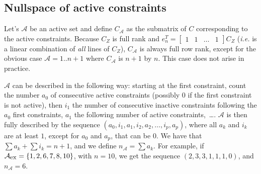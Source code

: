 \documentclass[]{article}
\newcommand{\BIN}{\begin{bmatrix}}
\newcommand{\BOUT}{\end{bmatrix}}
\begin{document}
\subsection{Nullspace of active constraints}
Let's $\mathcal{A}$ be an active set and define $C_\mathcal{A}$ as the submatrix of $C$ corresponding to the active constraints.
Because $C_Z$ is full rank and $e_n^T = \BIN 1 & 1 & \ldots & 1 \BOUT C_Z$ (\emph{i.e.} is a linear combination of \emph{all} lines of $C_Z$), $C_\mathcal{A}$ is always full row rank, except for the obvious case $\mathcal{A} = 1..n+1$ where $C_\mathcal{A}$ is $n+1$ by $n$. This case does not arise in practice.

$\mathcal{A}$ can be described in the following way: starting at the first constraint, count the number $a_0$ of consecutive active constraints (possibly $0$ if the first constraint is not active), then $i_1$ the number of consecutive inactive constraints following the $a_0$ first constraints, $a_1$ the following number of active constraints,~\ldots. $\mathcal{A}$ is then fully described by the sequence $(a_0, i_1, a_1, i_2, a_2, \ldots, i_p, a_p)$, where all $a_k$ and $i_k$ are at least $1$, except for $a_0$ and $a_p$, that can be $0$. We have that $\sum a_k + \sum i_k = n+1$, and we define $n_{\mathcal{A}} = \sum a_k$.
For example, if $\mathcal{A}_{\mbox{\small ex}} = \left\{1, 2, 6, 7, 8, 10\right\}$, with $n=10$, we get the sequence $(2,3,3,1,1,1,0)$, and $n_{\mathcal{A}} = 6$.
\end{document}
